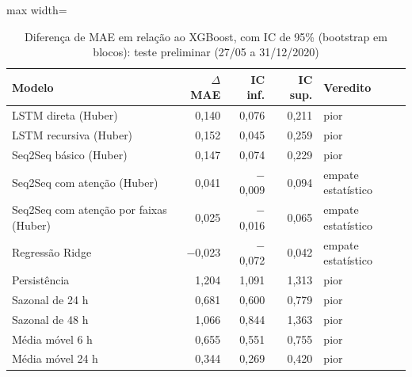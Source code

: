 \begin{table}[!htbp]
    \centering
    \caption{Diferença de MAE em relação ao XGBoost, com IC de 95\% (bootstrap em blocos): teste preliminar (27/05 a 31/12/2020)}
    \label{tab:pareado_teste_historico}
    \small
    \begin{adjustbox}{max width=\textwidth}
    \begin{tabular}{lrrrl}
        \toprule
        Modelo & $\Delta$ MAE & IC inf. & IC sup. & Veredito \\
        \midrule
        LSTM direta (Huber) & 0,140 & 0,076 & 0,211 & pior \\
        LSTM recursiva (Huber) & 0,152 & 0,045 & 0,259 & pior \\
        Seq2Seq básico (Huber) & 0,147 & 0,074 & 0,229 & pior \\
        Seq2Seq com atenção (Huber) & 0,041 & $-$0,009 & 0,094 & empate estatístico \\
        Seq2Seq com atenção por faixas (Huber) & 0,025 & $-$0,016 & 0,065 & empate estatístico \\
        Regressão Ridge & $-$0,023 & $-$0,072 & 0,042 & empate estatístico \\
        \midrule
        Persistência & 1,204 & 1,091 & 1,313 & pior \\
        Sazonal de 24 h & 0,681 & 0,600 & 0,779 & pior \\
        Sazonal de 48 h & 1,066 & 0,844 & 1,363 & pior \\
        Média móvel 6 h & 0,655 & 0,551 & 0,755 & pior \\
        Média móvel 24 h & 0,344 & 0,269 & 0,420 & pior \\
        \bottomrule
    \end{tabular}
    \end{adjustbox}
\end{table}
